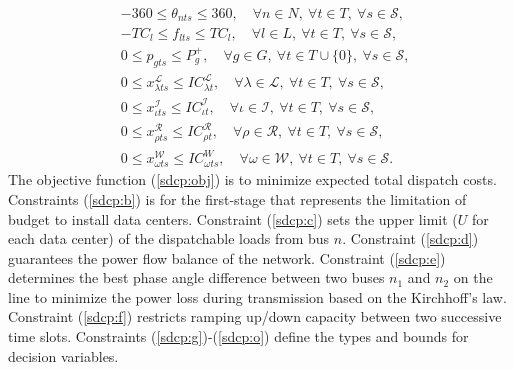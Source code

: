 \begin{subequations}
\begin{align}
	&-360\le\theta_{nts}\le 360,\quad\forall n\in N,\ \forall t\in T,\ \forall s\in\mathcal{S},\label{sdcp:i}\\
	&-TC_l\le f_{lts}\le TC_l,\quad\forall l\in L,\ \forall t\in T,\ \forall s\in\mathcal{S},\label{sdcp:j}\\
	&0\le p_{gts}\le P_g^+,\quad\forall g\in G,\ \forall t\in T\cup\{0\},\ \forall s\in\mathcal{S},\label{sdcp:k}\\
	&0\le x_{\lambda ts}^\mathcal{L}\le IC_{\lambda t}^\mathcal{L},\quad\forall \lambda\in \mathcal{L},\ \forall t\in T,\ \forall s\in\mathcal{S},\label{sdcp:l}\\
	&0\le x_{\iota ts}^\mathcal{I}\le IC_{\iota t}^\mathcal{I},\quad\forall \iota \in \mathcal{I},\ \forall t\in T,\ \forall s\in\mathcal{S},\label{sdcp:m}\\
	&0\le x_{\rho ts}^\mathcal{R} \le IC_{\rho t}^\mathcal{R},\quad\forall \rho\in\mathcal{R},\ \forall t\in T,\ \forall s\in\mathcal{S},\label{sdcp:n}\\
	&0\le x_{\omega ts}^\mathcal{W}\le IC_{\omega ts}^W,\quad\forall \omega\in\mathcal{W},\ \forall t\in T,\ \forall s\in\mathcal{S}.\label{sdcp:o}
	\end{align}	
\end{subequations}
The objective function (\ref{sdcp:obj}) is to minimize expected total dispatch costs. Constraints (\ref{sdcp:b}) is for the first-stage that represents the limitation of budget to install data centers. Constraint (\ref{sdcp:c}) sets the upper limit ($U$ for each data center) of the dispatchable loads from bus $n$. Constraint (\ref{sdcp:d}) guarantees the power flow balance of the network. Constraint (\ref{sdcp:e}) determines the best phase angle difference between two buses $n_1$ and $n_2$ on the line to minimize the power loss during transmission based on the Kirchhoff's law. Constraint (\ref{sdcp:f}) restricts ramping up/down capacity between two successive time slots. Constraints (\ref{sdcp:g})-(\ref{sdcp:o}) define the types and bounds for decision variables.

